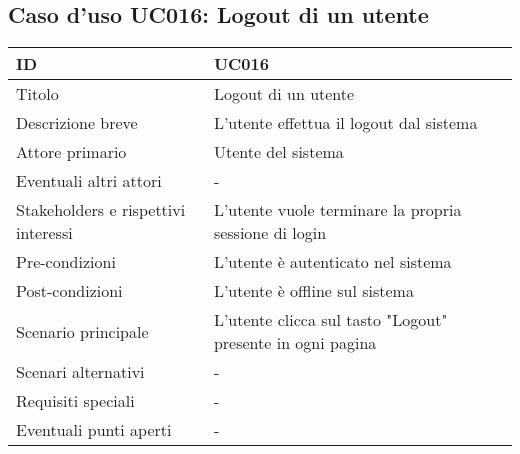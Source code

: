 \documentclass[../../main.tex]{subfiles}
\begin{document}
\subsection{Caso d’uso UC016: Logout di un utente }
\begin{tabularx}{150mm}{|l|X|}
    \hline
    ID                                  & \textbf{UC016}\\
    \hline
    Titolo                              & Logout di un utente \\
    \hline
    Descrizione breve                   & L'utente effettua il logout dal sistema   \\
    \hline
    Attore primario                     & Utente del sistema   \\
    \hline
    Eventuali altri attori              & -   \\
    \hline
    Stakeholders e rispettivi interessi & L'utente vuole terminare la propria sessione di login   \\
    \hline
    Pre-condizioni                      & L'utente è autenticato nel sistema   \\
    \hline
    Post-condizioni                     & L'utente è offline sul sistema    \\
    \hline
    Scenario principale                 & L'utente clicca sul tasto "Logout" presente in ogni pagina   \\
    \hline
    Scenari alternativi                 & -   \\
    \hline
    Requisiti speciali                  & -   \\
    \hline
    Eventuali punti aperti              & -   \\
    \hline
\end{tabularx}
\vfill
\newpage
\end{document}
